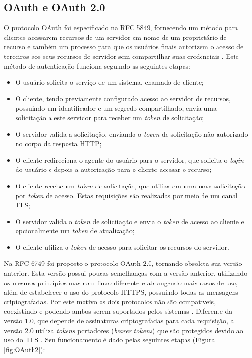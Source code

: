 \subsection{OAuth e OAuth 2.0}

O protocolo OAuth foi especificado na RFC 5849, fornecendo um método para clientes acessarem 
recursos de um servidor em nome de um proprietário de recurso e também um processo para que os 
usuários finais autorizem o acesso de terceiros aos seus recursos de servidor sem compartilhar suas
credenciais \cite{RFC5849}. Este método de autenticação funciona seguindo as seguintes etapas:

\begin{itemize}
\item O usuário solicita o serviço de um sistema, chamado de cliente;
\item O cliente, tendo previamente configurado acesso ao servidor de recursos, possuindo um 
identificador e um segredo compartilhado, envia uma solicitação a este servidor para receber um 
\emph{token} de solicitação;
\item O servidor valida a solicitação, enviando o \emph{token} de solicitação não-autorizado no 
corpo da resposta HTTP;
\item O cliente redireciona o agente do usuário para o servidor, que solicita o \emph{login} do 
usuário e depois a autorização para o cliente acessar o recurso;
\item O cliente recebe um \emph{token} de solicitação, que utiliza em uma nova solicitação por 
\emph{token} de acesso. Estas requisições são realizadas por meio de um canal TLS;
\item O servidor valida o \emph{token} de solicitação e envia o \emph{token} de acesso ao cliente e 
opcionalmente um \emph{token} de atualização;
\item O cliente utiliza o \emph{token} de acesso para solicitar os recursos do servidor.
\end{itemize}

Na RFC 6749 foi proposto o protocolo OAuth 2.0, tornando obsoleta sua versão anterior. Esta versão possui 
poucas semelhanças com a versão anterior, utilizando os mesmos princípios mas com fluxo diferente e 
abrangendo mais casos de uso, além de estabelecer o uso do protocolo HTTPS, possuindo todas as mensagens 
criptografadas. Por este motivo os dois protocolos não são compatíveis, coexistindo e podendo ambos serem 
suportados pelos sistemas \cite{RFC6749}. Diferente da versão 1.0, que depende de assinaturas 
criptografadas para cada requisição, a versão 2.0 utiliza \emph{tokens} portadores (\emph{bearer tokens}) 
que são protegidos devido ao uso do TLS \cite{SIRIWARDENA2014}. Seu funcionamento é dado pelas seguintes 
etapas (Figura \ref{fig:OAuth2}):

